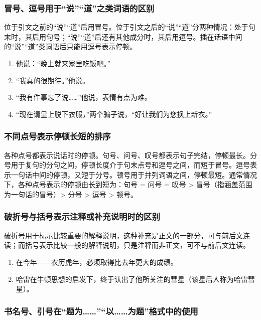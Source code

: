 \documentclass[a4paper]{article}
\begin{document}
\subsubsection{冒号、逗号用于“说”“道”之类词语的区别}

位于引文之前的“说”“道”后用冒号。位于引文之后的“说”“道”分两种情况：处于句末时，其后用句号；“说”“道”后还有其他成分时，其后用逗号。插在话语中间的“说”“道”类词语后只能用逗号表示停顿。

\begin{enumerate}
    \item 他说：“晚上就来家里吃饭吧。”
    \item “我真的很期待。”他说。
    \item “我有件事忘了说……”他说，表情有点为难。
    \item “现在请皇上脱下衣服，”两个骗子说，“好让我们为您换上新衣。”
\end{enumerate}

\subsubsection{不同点号表示停顿长短的排序}

各种点号都表示说话时的停顿。句号、问号、叹号都表示句子完结，停顿最长。分号用于复句的分句之间，停顿长度介于句末点号和逗号之间，而短于冒号。逗号表示一句话中间的停顿，又短于分号。顿号用于并列词语之间，停顿最短。通常情况下，各种点号表示的停顿由长到短为：句号 = 问号 = 叹号 > 冒号（指涵盖范围为一句话的冒号）> 分号 > 逗号 > 顿号。

\subsubsection{破折号与括号表示注释或补充说明时的区别}

破折号用于标示比较重要的解释说明，这种补充是正文的一部分，可与前后文连读；而括号表示比较一般的解释说明，只是注释而非正文，可不与前后文连读。

\begin{enumerate}
    \item 在今年——农历虎年，必须取得比去年更大的成绩。
    \item 哈雷在牛顿思想的启发下，终于认出了他所关注的彗星（该星后人称为哈雷彗星）。
\end{enumerate}

\subsubsection{书名号、引号在“题为……”“以……为题”格式中的使用}
\end{document}
